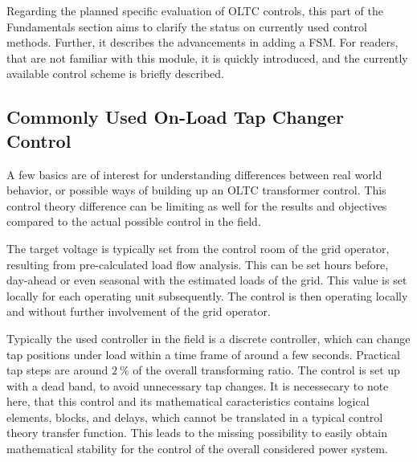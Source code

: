 Regarding the planned specific evaluation of \acs{OLTC} controls, this part of the Fundamentals section aims to clarify the status on currently used control methods.
Further, it describes the advancements in adding a \acf{FSM}.
For readers, that are not familiar with this module, it is quickly introduced, and the currently available control scheme is briefly described.

\subsection{Commonly Used On-Load Tap Changer Control}

A few basics are of interest for understanding differences between real world behavior, or possible ways of building up an \acs{OLTC} transformer control. 
This control theory difference can be limiting as well for the results and objectives compared to the actual possible control in the field.

The target voltage is typically set from the control room of the grid operator, resulting from pre-calculated load flow analysis. 
This can be set hours before, day-ahead or even seasonal with the estimated loads of the grid. 
This value is set locally for each operating unit subsequently. 
The control is then operating locally and without further involvement of the grid operator. \autocite{machowski_2020}

Typically the used controller in the field is a discrete controller, which can change tap positions under load within a time frame of around a few seconds. 
Practical tap steps are around $2~\mathrm{\%}$ of the overall transforming ratio. 
The control is set up with a dead band, to avoid unnecessary tap changes. 
It is necessecary to note here, that this control and its mathematical caracteristics contains logical elements, blocks, and delays, which cannot be translated in a typical control theory transfer function. 
This leads to the missing possibility to easily obtain mathematical stability for the control of the overall considered power system. \autocite{machowski_2020,kundur_2022}

